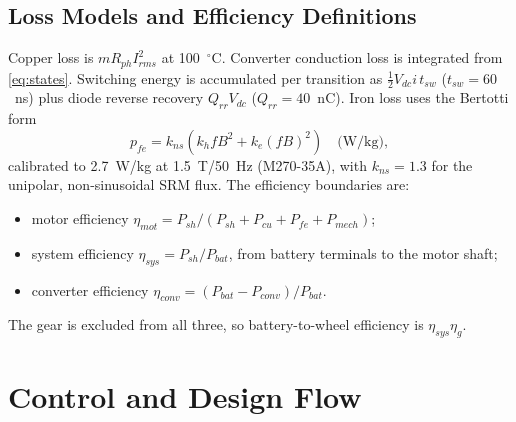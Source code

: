 \documentclass[journal]{IEEEtran}
\begin{document}
\subsection{Loss Models and Efficiency Definitions}
Copper loss is $mR_{ph}I_{rms}^2$ at 100~$^\circ$C. Converter conduction loss is
integrated from \eqref{eq:states}. Switching energy is accumulated per transition
as $\tfrac12V_{dc}i\,t_{sw}$ ($t_{sw}=60$~ns) plus diode reverse recovery
$Q_{rr}V_{dc}$ ($Q_{rr}=40$~nC). Iron loss uses the Bertotti form~\cite{bertotti1988}
\begin{equation}
p_{fe}=k_{ns}\left(k_h f B^2 + k_e (fB)^2\right)\quad\text{(W/kg)},
\label{eq:iron}
\end{equation}
calibrated to 2.7~W/kg at 1.5~T/50~Hz (M270-35A), with $k_{ns}=1.3$ for the
unipolar, non-sinusoidal SRM flux. The efficiency boundaries are:
\begin{itemize}
\item motor efficiency $\eta_{mot}=P_{sh}/(P_{sh}+P_{cu}+P_{fe}+P_{mech})$;
\item system efficiency $\eta_{sys}=P_{sh}/P_{bat}$, from battery terminals to the motor shaft;
\item converter efficiency $\eta_{conv}=(P_{bat}-P_{conv})/P_{bat}$.
\end{itemize}
The gear is excluded from all three, so battery-to-wheel efficiency is
$\eta_{sys}\eta_g$.

\section{Control and Design Flow}
\label{sec:flow}
\end{document}

